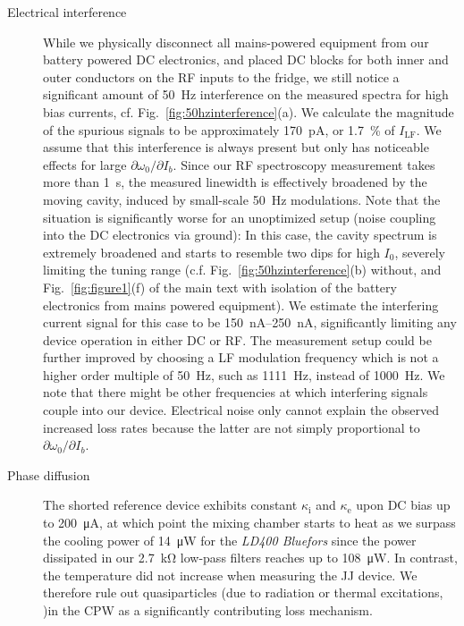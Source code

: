 \begin{description}
	\item[Electrical interference] While we physically disconnect all mains-powered equipment from our battery powered DC electronics, and placed DC blocks for both inner and outer conductors on the RF inputs to the fridge, we still notice a significant amount of \SI{50}{\hertz} interference on the measured spectra for high bias currents, cf. Fig.~\ref{fig:50hzinterference}(a).
	We calculate the magnitude of the spurious signals to be approximately \SI{170}{\pico\ampere}, or \SI{1.7}{\percent} of $I_\text{LF}$.
	We assume that this interference is always present but only has noticeable effects for large $\partial\omega_0/\partial I_b$.
	Since our RF spectroscopy measurement takes more than \SI{1}{\second}, the measured linewidth is effectively broadened by the moving cavity, induced by small-scale \SI{50}{\hertz} modulations.
	Note that the situation is significantly worse for an unoptimized setup (noise coupling into the DC electronics via ground):
	In this case, the cavity spectrum is extremely broadened and starts to resemble two dips for high $I_0$, severely limiting the tuning range (c.f. Fig.~\ref{fig:50hzinterference}(b) without, and Fig.~\ref{fig:figure1}(f) of the main text with isolation of the battery electronics from mains powered equipment).
	We estimate the interfering current signal for this case to be \SIrange{150}{250}{\nano\ampere}, significantly limiting any device operation in either DC or RF.
	The measurement setup could be further improved by choosing a LF modulation frequency which is not a higher order multiple of \SI{50}{\hertz}, such as \SI{1111}{\hertz}, instead of \SI{1000}{\hertz}.
	We note that there might be other frequencies at which interfering signals couple into our device.
	Electrical noise only cannot explain the observed increased loss rates because the latter are not simply proportional to $\partial\omega_0/\partial I_b$.
	\item[Phase diffusion] The shorted reference device exhibits constant $\kappa_\text{i}$ and $\kappa_\text{e}$ upon DC bias up to \SI{200}{\micro\ampere}, at which point the mixing chamber starts to heat as we surpass the cooling power  of \SI{14}{\micro\watt} for the \textit{LD400 Bluefors} since the power dissipated in our \SI{2.7}{\kilo\ohm} low-pass filters reaches up to \SI{108}{\micro\watt}.
	In contrast, the temperature did not increase when measuring the JJ device.
	We therefore rule out quasiparticles (due to radiation or thermal excitations, \cite{tinkhamIntroductionSuperconductivity1996})in the CPW as a significantly contributing loss mechanism.

\end{description}
